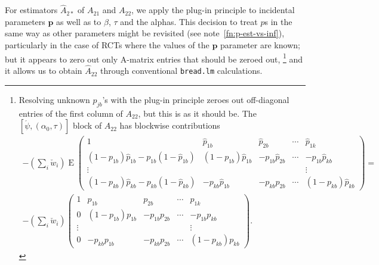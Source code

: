 \documentclass{article}
\newcommand{\EE}{\operatorname{E}}
\newcommand{\owt}[1][{[z_{i}]}]{\ensuremath{\check{w}_{i#1}}}
\begin{document}
For estimators $\hat{A}_{2*}$ of $A_{21}$ and $A_{22}$, we apply the plug-in
principle to incidental parameters $\mathbf{p}$ as well as to $\beta$,
$\tau$ and the alphas. This decision to treat $p$s in the same way as
other parameters might be revisited (see note~\ref{fn:p-est-vs-inf}), particularly in the case of RCTs
where the values of the $\mathbf{p}$ parameter are known; but it appears to zero
out only A-matrix entries that should be zeroed out,%
\footnote{%
Resolving unknown $p_{jb}$'s with the plug-in principle zeroes out
off-diagonal entries of the first column of $A_{22}$, but this is as
it should be. The $[\acute{\psi}, (\alpha_{0}, \tau)]$ block of $A_{22}$ has
blockwise contributions
\begin{multline*}
-  (\sum_{i}\owt[])\EE \begin{pmatrix}
    1 & \hat{p}_{1b}& \hat{p}_{2b}&\cdots & \hat{p}_{1k}\\
    (1-p_{1b})\hat{p}_{1b} - p_{1b}(1-\hat{p}_{1b})&
    (1-p_{1b})\hat{p}_{1b}&
    -p_{1b}\hat{p}_{2b}& \cdots & -p_{1b}\hat{p}_{kb}\\
    \vdots & & & & \vdots \\
    (1-p_{kb})\hat{p}_{kb} - p_{kb}(1-\hat{p}_{kb})&
    -p_{kb}\hat{p}_{1b}& -p_{kb}\hat{p}_{2b}& \cdots & (1-p_{kb})\hat{p}_{kb} 
  \end{pmatrix} =\\
-  (\sum_{i}\owt[])\begin{pmatrix}
    1 & {p}_{1b}& {p}_{2b}&\cdots & {p}_{1k}\\
    0&
    (1-p_{1b}){p}_{1b}&
    -p_{1b}{p}_{2b}& \cdots & -p_{1b}{p}_{kb}\\
    \vdots & & & & \vdots \\
    0&
    -p_{kb}{p}_{1b}& -p_{kb}{p}_{2b}& \cdots & (1-p_{kb}){p}_{kb} 
  \end{pmatrix}.
\end{multline*}
}
and it allows us to obtain $\hat{A}_{22}$ through conventional \texttt{bread.lm}
calculations. 
\end{document}
